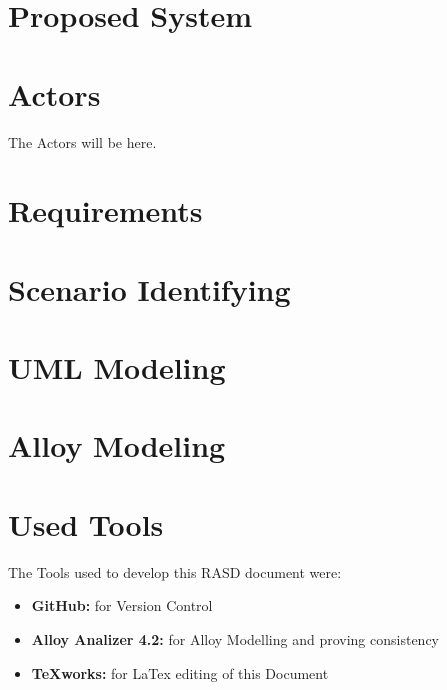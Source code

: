 \documentclass[a4paper]{article}
\begin{document}
\section{Proposed System}

\section{Actors}

The Actors will be here.

\section{Requirements}

\section{Scenario Identifying}

\section{UML Modeling}

\section{Alloy Modeling}
\newpage

\section{Used Tools}
The Tools used to develop this RASD document were:
\begin{itemize}
	\item \textbf{GitHub:} for Version Control
	\item \textbf{Alloy Analizer 4.2:} for Alloy Modelling and proving consistency 
	\item \textbf {TeXworks:} for LaTex editing of this Document
\end{itemize}
\newpage
\end{document}
